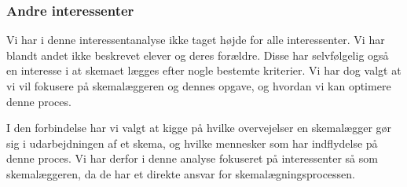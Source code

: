 \subsubsection{Andre interessenter}
Vi har i denne interessentanalyse ikke taget højde for alle interessenter. Vi har blandt andet ikke beskrevet elever og deres forældre. Disse har selvfølgelig også en interesse i at skemaet lægges efter nogle bestemte kriterier. Vi har dog valgt at vi vil fokusere på skemalæggeren og dennes opgave, og hvordan vi kan optimere denne proces.

I den forbindelse har vi valgt at kigge på hvilke overvejelser en skemalægger gør sig i udarbejdningen af et skema, og hvilke mennesker som har indflydelse på denne proces. Vi har derfor i denne analyse fokuseret på interessenter så som skemalæggeren, da de har et direkte ansvar for skemalægningsprocessen.





